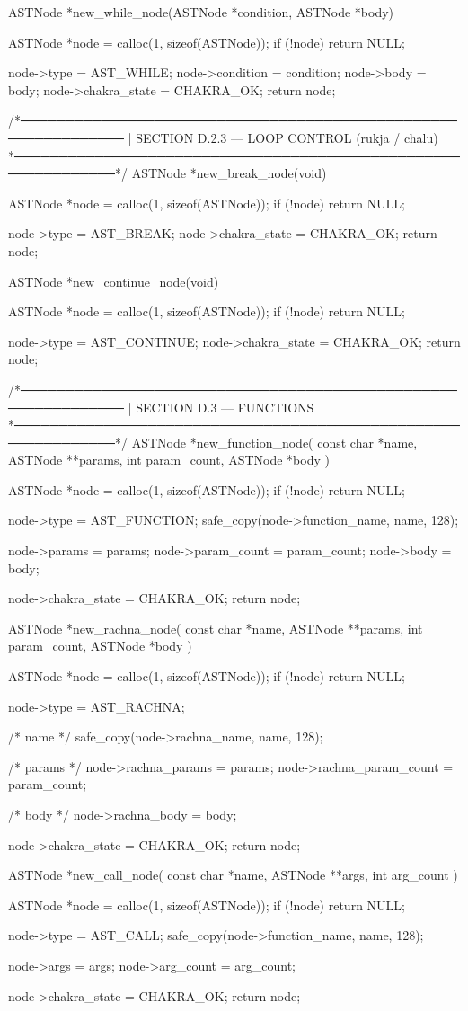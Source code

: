 \documentclass{article}
\begin{document}
ASTNode *new_while_node(ASTNode *condition, ASTNode *body)
{
    ASTNode *node = calloc(1, sizeof(ASTNode));
    if (!node) return NULL;

    node->type = AST_WHILE;
    node->condition = condition;
    node->body = body;
    node->chakra_state = CHAKRA_OK;
    return node;
}

/*──────────────────────────────────────────────────────────────
 | SECTION D.2.3 — LOOP CONTROL (rukja / chalu)
 *──────────────────────────────────────────────────────────────*/
ASTNode *new_break_node(void)
{
    ASTNode *node = calloc(1, sizeof(ASTNode));
    if (!node) return NULL;

    node->type = AST_BREAK;
    node->chakra_state = CHAKRA_OK;
    return node;
}

ASTNode *new_continue_node(void)
{
    ASTNode *node = calloc(1, sizeof(ASTNode));
    if (!node) return NULL;

    node->type = AST_CONTINUE;
    node->chakra_state = CHAKRA_OK;
    return node;
}

/*──────────────────────────────────────────────────────────────
 | SECTION D.3 — FUNCTIONS
 *──────────────────────────────────────────────────────────────*/
ASTNode *new_function_node(
    const char *name,
    ASTNode **params,
    int param_count,
    ASTNode *body
) {
    ASTNode *node = calloc(1, sizeof(ASTNode));
    if (!node) return NULL;

    node->type = AST_FUNCTION;
    safe_copy(node->function_name, name, 128);

    node->params = params;
    node->param_count = param_count;
    node->body = body;

    node->chakra_state = CHAKRA_OK;
    return node;
}

ASTNode *new_rachna_node(
    const char *name,
    ASTNode **params,
    int param_count,
    ASTNode *body
)
{
    ASTNode *node = calloc(1, sizeof(ASTNode));
    if (!node) return NULL;

    node->type = AST_RACHNA;

    /* name */
    safe_copy(node->rachna_name, name, 128);

    /* params */
    node->rachna_params = params;
    node->rachna_param_count = param_count;

    /* body */
    node->rachna_body = body;

    node->chakra_state = CHAKRA_OK;
    return node;
}

ASTNode *new_call_node(
    const char *name,
    ASTNode **args,
    int arg_count
) {
    ASTNode *node = calloc(1, sizeof(ASTNode));
    if (!node) return NULL;

    node->type = AST_CALL;
    safe_copy(node->function_name, name, 128);

    node->args = args;
    node->arg_count = arg_count;

    node->chakra_state = CHAKRA_OK;
    return node;
}
\end{document}
